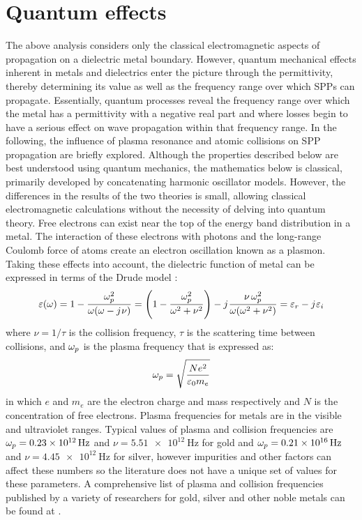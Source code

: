 \section{Quantum effects}
%
The above analysis considers only the classical electromagnetic aspects of propagation on a dielectric metal boundary. However, quantum mechanical effects inherent in metals and dielectrics enter the picture through the permittivity, thereby determining its value as well as the frequency range over which SPPs can propagate. Essentially, quantum processes reveal the frequency range over which the metal has a permittivity with a negative real part and where losses begin to have a serious effect on wave propagation within that frequency range. In the following, the influence of plasma resonance and atomic collisions on SPP propagation are briefly explored.  Although the properties described below are best understood using quantum mechanics, the mathematics below is classical, primarily developed by concatenating harmonic oscillator models. However, the differences in the results of the two theories is small, allowing classical electromagnetic calculations without the necessity of delving into quantum theory.
Free electrons can exist near the top of the energy band distribution in a metal. The interaction of these electrons with photons and the long-range Coulomb force of atoms create an electron oscillation known as a plasmon. Taking these effects into account, the dielectric function of metal can be expressed in terms of the Drude model \cite{MaxBorn2002}:
%
\begin{equation}
  \varepsilon(\omega) = 1 - \frac{\omega_p^2}{\omega(\omega  - j\mkern1mu \nu)} = \left(1 - \frac{\omega_p^2}{\omega^2 + \nu^2} \right) - j\mkern1mu \frac{\nu \, \omega_p^2}{\omega (\omega^2 + \nu^2)} = \varepsilon_r - j\mkern1mu \varepsilon_i
  \label{eq:drude}
\end{equation}
%
where $\nu = 1/\tau$ is the collision frequency, $\tau$ is the scattering time between collisions, and $\omega_p$ is the plasma frequency that is expressed as:
%
\begin{equation}
  \omega_p = \sqrt{\frac{N e^2}{\varepsilon_0 m_e}}
  \label{eq:plasma_f}
\end{equation}
%
in which $e$ and $m_e$ are the electron charge and mass respectively and $N$ is the concentration of free electrons. Plasma frequencies for metals are in the visible and ultraviolet ranges. Typical values of plasma and collision frequencies are $\O_p = \SI{.23e12}{\Hz}$ and
$\nu = \SI{5.51e12}{\Hz}$ for gold and $\O_p = \SI{.21e16}{\Hz}$ and $\nu = \SI{4.45e12}{\Hz}$ for silver, however impurities and other factors can affect these numbers so the literature does not have a unique set of values for these parameters. A comprehensive list of plasma and collision frequencies published by a variety of researchers for gold, silver and other noble metals can be found at \cite{Moroz2010}.

